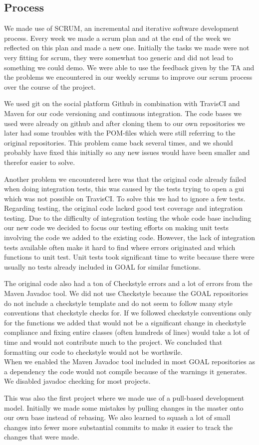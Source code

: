 \documentclass[11pt]{article}
\begin{document}
\subsection{Process}
We made use of \gls{SCRUM}, an incremental and iterative software development process. Every week we made a scrum plan and at the end of the week we reflected on this plan and made a new one. Initially the tasks we made were not very fitting for scrum, they were somewhat too generic and did not lead to something we could demo. We were able to use the feedback given by the TA and the problems we encountered in our weekly scrums to improve our scrum process over the course of the project. \par 
We used git on the social platform Github in combination with TravisCI and Maven for our code versioning and continuous integration. The code bases we used were already on github and after cloning them to our own repositories we later had some troubles with the POM-files which were still referring to the original repositories. This problem came back several times, and we should probably have fixed this initially so any new issues would have been smaller and therefor easier to solve. \par 
Another problem we encountered here was that the original code already failed when doing integration tests, this was caused by the tests trying to open a gui which was not possible on \gls{TravisCI}. To solve this we had to ignore a few tests. Regarding testing, the original code lacked good test coverage and integration testing. Due to the difficulty of integration testing the whole code base including our new code we decided to focus our testing efforts on making unit tests involving the code we added to the existing code. However, the lack of integration tests available often make it hard to find where errors originated and which functions to unit test. Unit tests took significant time to write because there were usually no tests already included in GOAL for similar functions. \par 
The original code also had a ton of Checkstyle errors and a lot of errors from the Maven Javadoc tool. We did not use Checkstyle because the GOAL repositories do not include a checkstyle template and do not seem to follow many style conventions that checkstyle checks for. If we followed checkstyle conventions only for the functions we added that would not be a significant change in checkstyle compliance and fixing entire classes (often hundreds of lines) would take a lot of time and would not contribute much to the project. We concluded that formatting our code to checkstyle would not be worthwile.\\
When we enabled the Maven Javadoc tool included in most GOAL repositories as a dependency the code would not compile because of the warnings it generates. We disabled javadoc checking for most projects.\par
This was also the first project where we made use of a pull-based development model. Initially we made some mistakes by pulling changes in the master onto our own base instead of rebasing. We also learned to squash a lot of small changes into fewer more substantial commits to make it easier to track the changes that were made. 
\clearpage
\end{document}
